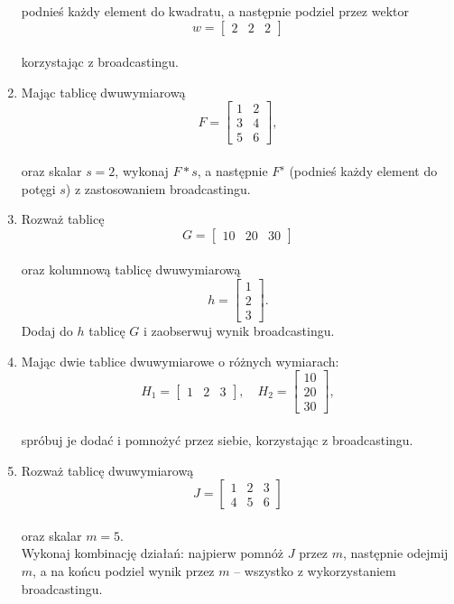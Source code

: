 \documentclass[
  polish,
  letterpaper,
  DIV=11,
  numbers=noendperiod]{scrreprt}
\begin{document}
\begin{enumerate}
  podnieś każdy element do kwadratu, a następnie podziel przez wektor\\
  \[w = \begin{bmatrix}2 & 2 & 2\end{bmatrix}\]\\
  korzystając z broadcastingu.
\item
  Mając tablicę dwuwymiarową\\
  \[F = \begin{bmatrix}1 & 2 \\ 3 & 4 \\ 5 & 6\end{bmatrix},\]\\
  oraz skalar \(s = 2\), wykonaj \(F * s\), a następnie \(F^{s}\)
  (podnieś każdy element do potęgi \(s\)) z zastosowaniem broadcastingu.
\item
  Rozważ tablicę\\
  \[G = \begin{bmatrix}10 & 20 & 30\end{bmatrix}\]\\
  oraz kolumnową tablicę dwuwymiarową\\
  \[h = \begin{bmatrix}1 \\ 2 \\ 3\end{bmatrix}.\] Dodaj do \(h\)
  tablicę \(G\) i zaobserwuj wynik broadcastingu.
\item
  Mając dwie tablice dwuwymiarowe o różnych wymiarach:\\
  \[H_1 = \begin{bmatrix}1 & 2 & 3\end{bmatrix}, \quad H_2 = \begin{bmatrix}10 \\ 20 \\ 30\end{bmatrix},\]\\
  spróbuj je dodać i pomnożyć przez siebie, korzystając z broadcastingu.
\item
  Rozważ tablicę dwuwymiarową\\
  \[J = \begin{bmatrix}1 & 2 & 3 \\ 4 & 5 & 6\end{bmatrix}\]\\
  oraz skalar \(m = 5\).\\
  Wykonaj kombinację działań: najpierw pomnóż \(J\) przez \(m\),
  następnie odejmij \(m\), a na końcu podziel wynik przez \(m\) --
  wszystko z wykorzystaniem broadcastingu.
\end{enumerate}
\end{document}
